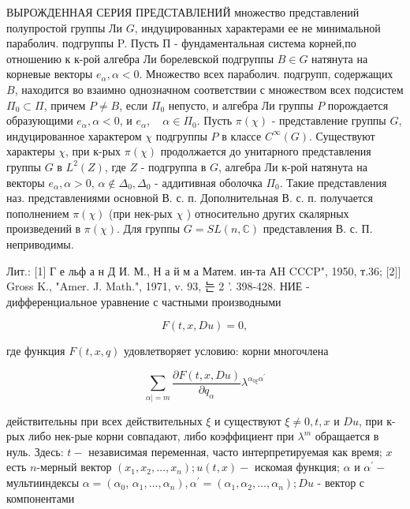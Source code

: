 \documentclass[10pt]{article}
\begin{document}
ВЫРОЖДЕННАЯ СЕРИЯ ПРЕДСТАВЛЕНИЙ множество представлений полупростой группы Ли $G$, индуцированных характерами ее не минимальной параболич. подгруппы P. Пусть П - фундаментальная система корней,по отношению к к-рой алгебра Ли борелевской подгруппы $B \in G$ натянута на корневые векторы $e_{\alpha}, \alpha<0$. Множество всех параболич. подгрупп, содержащих $B$, находится во взаимно однозначном соответствии с множеством всех подсистем $\Pi_{0} \subset \Pi$, причем $P \neq B$, если $\Pi_{0}$ непусто, и алгебра Ли группы $P$ порождается образующими $e_{\alpha}, \alpha<0$, и $e_{\alpha}, \quad \alpha \in \Pi_{0}$. Пусть $\pi(\chi)$ - представление группы $G$, индуцированное характером $\chi$ подгруппы $P$ в классе $C^{\infty}(G)$. Существуют характеры $\chi$, при к-рых $\pi(\chi)$ продолжается до унитарного представления группы $G$ в $L^{2}(Z)$, где $Z$ - подгруппа в $G$, алгебра Ли к-рой натянута на векторы $e_{\alpha}, \alpha>0$, $\alpha \notin \Delta_{0}, \Delta_{0}$ - аддитивная оболочка $\Pi_{0}$. Такие представления наз. представлениями основной В. с. п. Дополнительная В. с. п. получается пополнением $\pi(\chi)$ (при нек-рых $\chi$ ) относительно других скалярных произведений в $\pi(\chi)$. Для группы $G=S L(n, \mathbb{C})$ представления В. с. П. неприводимы.



Лит.: [1] Г е льф а н Д И. М., Н а й м а Матем. ин-та АH CCCP", 1950, т.36; [2]] Gross K., "Amer. J. Math.", 1971, v. 93, 는 2 '. 398-428. НИЕ - дифференциальное уравнение с частными производными



\[

F(t, x, D u)=0,

\]



где функция $F(t, x, q)$ удовлетворяет условию: корни многочлена



\[

\sum_{\alpha \mid=m} \frac{\partial F(t, x, D u)}{\partial q_{\alpha}} \lambda^{\alpha_{0 \xi} \alpha^{\prime}}

\]



действительны при всех действительных $\xi$ и существуют $\xi \neq 0, t, x$ и $D u$, при к-рых либо нек-рые корни совпадают, либо коэффициент при $\lambda^{m}$ обращается в нуль. Здесь: $t-$ независимая переменная, часто интерпретируемая как время; $x$ есть $n$-мерный вектор $\left(x_{1}, x_{2}, \ldots, x_{n}\right) ; u(t, x)-$ искомая функция; $\alpha$ и $\alpha^{\prime}-$ мультииндексы $\alpha=\left(\alpha_{0}\right.$, $\left.\alpha_{1}, \ldots, \alpha_{n}\right), \alpha^{\prime}=\left(\alpha_{1}, \alpha_{2}, \ldots, \alpha_{n}\right) ; D u$ - вектор с компонентами
\end{document}
